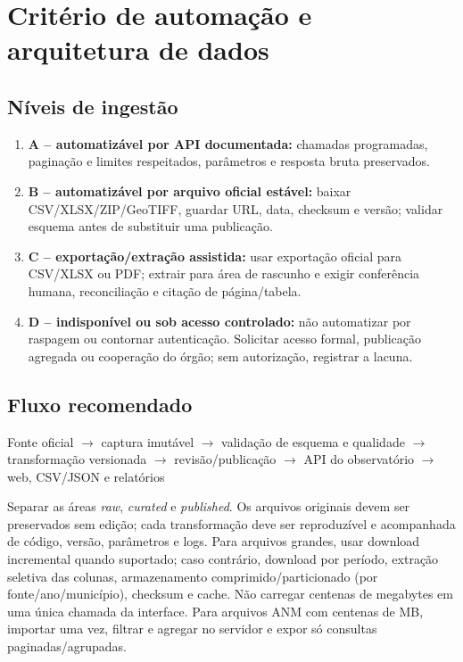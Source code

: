 \documentclass[12pt]{article}
\begin{document}
\section{Critério de automação e arquitetura de dados}
\subsection{Níveis de ingestão}
\begin{enumerate}
  \item \textbf{A -- automatizável por API documentada:} chamadas programadas, paginação e limites respeitados, parâmetros e resposta bruta preservados.
  \item \textbf{B -- automatizável por arquivo oficial estável:} baixar CSV/XLSX/ZIP/GeoTIFF, guardar URL, data, checksum e versão; validar esquema antes de substituir uma publicação.
  \item \textbf{C -- exportação/extração assistida:} usar exportação oficial para CSV/XLSX ou PDF; extrair para área de rascunho e exigir conferência humana, reconciliação e citação de página/tabela.
  \item \textbf{D -- indisponível ou sob acesso controlado:} não automatizar por raspagem ou contornar autenticação. Solicitar acesso formal, publicação agregada ou cooperação do órgão; sem autorização, registrar a lacuna.
\end{enumerate}

\subsection{Fluxo recomendado}
\begin{center}
Fonte oficial $\rightarrow$ captura imutável $\rightarrow$ validação de esquema e qualidade $\rightarrow$ transformação versionada $\rightarrow$ revisão/publicação $\rightarrow$ API do observatório $\rightarrow$ web, CSV/JSON e relatórios
\end{center}
Separar as áreas \emph{raw}, \emph{curated} e \emph{published}. Os arquivos originais devem ser preservados sem edição; cada transformação deve ser reproduzível e acompanhada de código, versão, parâmetros e logs. Para arquivos grandes, usar download incremental quando suportado; caso contrário, download por período, extração seletiva das colunas, armazenamento comprimido/particionado (por fonte/ano/município), checksum e cache. Não carregar centenas de megabytes em uma única chamada da interface. Para arquivos ANM com centenas de MB, importar uma vez, filtrar e agregar no servidor e expor só consultas paginadas/agrupadas.
\end{document}
